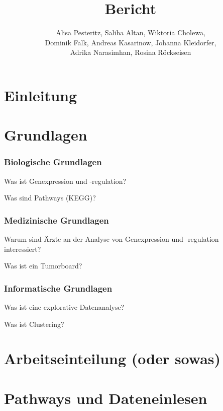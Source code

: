 \documentclass[12pt]{article}
\title{Bericht}
\author{Alisa Pesteritz, Saliha Altan, Wiktoria Cholewa, \\ 
	Dominik Falk, Andreas Kasarinow, Johanna Kleidorfer, \\
	Adrika Narasimhan, Rosina Röckseisen}
\begin{document}
\newpage
\maketitle

\newpage
\pagestyle{fancy}
\fancyhead{}
\section{Einleitung}
\label{einleitung}

\section{Grundlagen}
\label{grundlagen}

\subsubsection{Biologische Grundlagen}
\label{bio-grundlagen}
Was ist Genexpression und -regulation?

Was sind Pathways (KEGG)?

\subsubsection{Medizinische Grundlagen}
\label{medizin-grundlagen}
Warum sind Ärzte an der Analyse von Genexpression und -regulation interessiert?

Was ist ein Tumorboard?

\subsubsection{Informatische Grundlagen}
\label{info-grundlagen}
Was ist eine explorative Datenanalyse?

Was ist Clustering?


\section{Arbeitseinteilung (oder sowas)}
\label{arbeitseinteilung}

\newpage
\pagestyle{fancy}
\fancyhead{}
\section{Pathways und Dateneinlesen}
\label{pathways}
\end{document}

